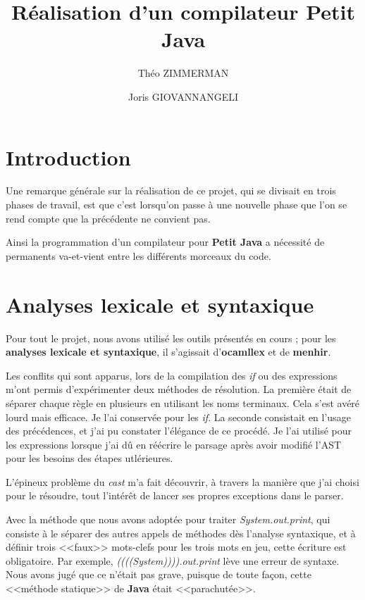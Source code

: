 \documentclass{article}
\title{Réalisation d'un compilateur Petit Java}
\author{Théo ZIMMERMAN \and Joris GIOVANNANGELI}
\begin{document}
\maketitle

\section*{Introduction}

Une remarque générale sur la réalisation de ce projet, qui se divisait en
trois phases de travail, est que c'est lorsqu'on passe à une nouvelle phase
que l'on se rend compte que la précédente ne convient pas.

Ainsi la programmation d'un compilateur pour \textbf{Petit Java} a
nécessité de permanents va-et-vient entre les différents morceaux du code.

\section{Analyses lexicale et syntaxique}

Pour tout le projet, nous avons utilisé les outils présentés en cours ;
pour les \textbf{analyses lexicale et syntaxique}, il s'agissait d'\textbf{ocamllex}
et de \textbf{menhir}.

Les conflits qui sont apparus, lors de la compilation des \emph{if} ou des
expressions m'ont permis d'expérimenter deux méthodes de résolution.
La première était de séparer chaque règle en plusieurs en utilisant les
noms terminaux. Cela s'est avéré lourd mais efficace. Je l'ai conservée pour
les \emph{if}. La seconde consistait en l'usage des précédences, et j'ai pu
constater l'élégance de ce procédé. Je l'ai utilisé pour les expressions
lorsque j'ai dû en réécrire le parsage après avoir modifié l'AST pour les
besoins des étapes utlérieures.

L'épineux problème du \emph{cast} m'a fait découvrir, à travers la manière
que j'ai choisi pour le résoudre, tout l'intérêt de lancer ses propres
exceptions dans le parser.

Avec la méthode que nous avons adoptée pour traiter
\emph{System.out.print}, qui consiste à le séparer des autres appels de
méthodes dès l'analyse syntaxique, et à définir trois <<faux>> mots-clefs
pour les trois mots en jeu, cette écriture est obligatoire. Par
exemple, \emph{((((System)))).out.print} lève une erreur de syntaxe.
Nous avons jugé que ce n'était pas grave, puisque de toute façon, cette
<<méthode statique>> de \textbf{Java} était <<parachutée>>.
\end{document}
